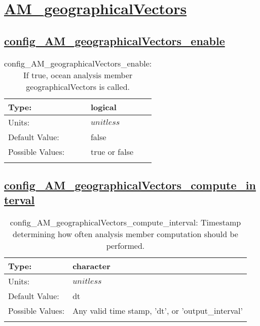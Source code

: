 \section[AM\_geographicalVectors]{\hyperref[sec:nm_tab_AM_geographicalVectors]{AM\_geographicalVectors}}
\label{sec:nm_sec_AM_geographicalVectors}
\subsection[config\_AM\_geographicalVectors\_enable]{\hyperref[sec:nm_tab_AM_geographicalVectors]{config\_AM\_geographicalVectors\_enable}}
\label{subsec:nm_sec_config_AM_geographicalVectors_enable}
\begin{center}
\begin{longtable}{| p{2.0in} || p{4.0in} |}
    \hline
    Type: & logical \\
    \hline
    Units: & $unitless$ \\
    \hline
    Default Value: & false \\
    \hline
    Possible Values: & true or false \\
    \hline
    \caption{config\_AM\_geographicalVectors\_enable: If true, ocean analysis member geographicalVectors is called.}
\end{longtable}
\end{center}
\subsection[config\_AM\_geographicalVectors\_compute\_interval]{\hyperref[sec:nm_tab_AM_geographicalVectors]{config\_AM\_geographicalVectors\_compute\_interval}}
\label{subsec:nm_sec_config_AM_geographicalVectors_compute_interval}
\begin{center}
\begin{longtable}{| p{2.0in} || p{4.0in} |}
    \hline
    Type: & character \\
    \hline
    Units: & $unitless$ \\
    \hline
    Default Value: & dt \\
    \hline
    Possible Values: & Any valid time stamp, 'dt', or 'output\_interval' \\
    \hline
    \caption{config\_AM\_geographicalVectors\_compute\_interval: Timestamp determining how often analysis member computation should be performed.}
\end{longtable}
\end{center}
